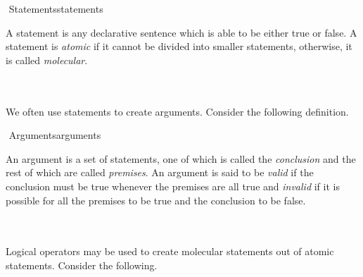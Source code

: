         \begin{definition}{\Stop\,\,Statements}{statements}
        
            A statement is any declarative sentence which is able to be either true or false. A statement is \textit{atomic} if it cannot be divided into smaller statements, otherwise, it is called \textit{molecular}.
        
        \end{definition}
        \vphantom
        \\
        \\
        We often use statements to create arguments. Consider the following definition.
        \begin{definition}{\Stop\,\,Arguments}{arguments}
        
            An argument is a set of statements, one of which is called the \textit{conclusion} and the rest of which are called \textit{premises}. An argument is said to be \textit{valid} if the conclusion must be true whenever the premises are all true and \textit{invalid} if it is possible for all the premises to be true and the conclusion to be false.
        
        \end{definition}
        \pagebreak
        \vphantom
        \\
        \\
        Logical operators may be used to create molecular statements out of atomic statements. Consider the following.
